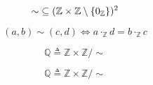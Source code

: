 \begin{frame}{}
  \begin{definition}
    \[
      \sim\; \subseteq (\mathbb{Z} \times \mathbb{Z} \setminus \{0_{\mathbb{Z}}\})^{2}
    \]

    \[
      (a, b) \sim (c, d) \iff a \cdot_{\mathbb{Z}} d = b \cdot_{\mathbb{Z}} c
    \]
  \end{definition}

  \pause
  \vspace{0.30cm}
  \begin{definition}[$\mathbb{Q}$]
    \[
      \mathbb{Q} \triangleq \mathbb{Z} \times \mathbb{Z}/\sim
    \]
  \end{definition}
\end{frame}

\begin{frame}{}
  \[
    \mathbb{Q} \triangleq \mathbb{Z} \times \mathbb{Z}/\sim
  \]
\end{frame}

\begin{frame}{}
  \begin{center}
  \end{center}

  \pause
\end{frame}
